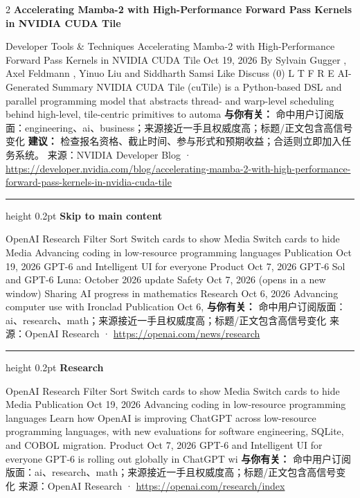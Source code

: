 \documentclass[10.5pt]{ctexart}
\begin{document}
\begin{multicols}{2}
{\large\bfseries Accelerating Mamba-2 with High-Performance Forward Pass Kernels in NVIDIA CUDA Tile}\par
Developer Tools \& Techniques Accelerating Mamba-2 with High-Performance Forward Pass Kernels in NVIDIA CUDA Tile Oct 19, 2026 By Sylvain Gugger , Axel Feldmann , Yinuo Liu and Siddharth Samsi Like Discuss (0) L T F R E AI-Generated Summary NVIDIA CUDA Tile (cuTile) is a Python-based DSL and parallel programming model that abstracts thread- and warp-level scheduling behind high-level, tile-centric primitives to automa
\textbf{与你有关：} 命中用户订阅版面：engineering、ai、business；来源接近一手且权威度高；标题/正文包含高信号变化
\textbf{建议：} 检查报名资格、截止时间、参与形式和预期收益；合适则立即加入任务系统。
{\footnotesize\color{ormuted} 来源：NVIDIA Developer Blog · \url{https://developer.nvidia.com/blog/accelerating-mamba-2-with-high-performance-forward-pass-kernels-in-nvidia-cuda-tile}}
\vspace{2mm}
\hrule height 0.2pt
\vspace{2mm}
{\large\bfseries Skip to main content}\par
OpenAI Research Filter Sort Switch cards to show Media Switch cards to hide Media Advancing coding in low‑resource programming languages Publication Oct 19, 2026 GPT-6 and Intelligent UI for everyone Product Oct 7, 2026 GPT‑6 Sol and GPT‑6 Luna: October 2026 update Safety Oct 7, 2026 (opens in a new window) Sharing AI progress in mathematics Research Oct 6, 2026 Advancing computer use with Ironclad Publication Oct 6,
\textbf{与你有关：} 命中用户订阅版面：ai、research、math；来源接近一手且权威度高；标题/正文包含高信号变化
{\footnotesize\color{ormuted} 来源：OpenAI Research · \url{https://openai.com/news/research}}
\vspace{2mm}
\hrule height 0.2pt
\vspace{2mm}
{\large\bfseries Research}\par
OpenAI Research Filter Sort Switch cards to show Media Switch cards to hide Media Publication Oct 19, 2026 Advancing coding in low‑resource programming languages Learn how OpenAI is improving ChatGPT across low-resource programming languages, with new evaluations for software engineering, SQLite, and COBOL migration. Product Oct 7, 2026 GPT-6 and Intelligent UI for everyone GPT‑6 is rolling out globally in ChatGPT wi
\textbf{与你有关：} 命中用户订阅版面：ai、research、math；来源接近一手且权威度高；标题/正文包含高信号变化
{\footnotesize\color{ormuted} 来源：OpenAI Research · \url{https://openai.com/research/index}}

\end{multicols}
\end{document}
